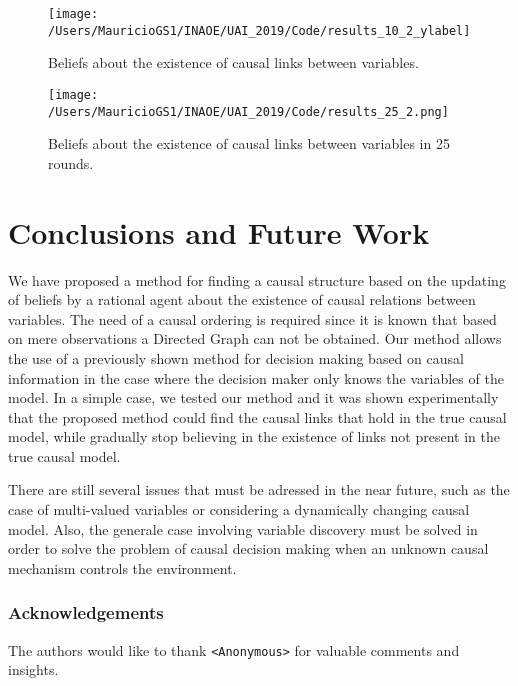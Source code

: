 \documentclass[letterpaper]{article}
\begin{document}
\begin{figure}[ht]
\vskip 0.2in
\begin{center}
\centerline{\texttt{[image: /Users/MauricioGS1/INAOE/UAI\_2019/Code/results\_10\_2\_ylabel]}}
\caption{Beliefs about the existence of causal links between variables.}
\label{10_rounds}
\end{center}
\vskip -0.2in
\end{figure}

\begin{figure}[ht]
\vskip 0.2in
\begin{center}
\centerline{\texttt{[image: /Users/MauricioGS1/INAOE/UAI\_2019/Code/results\_25\_2.png]}}
\caption{Beliefs about the existence of causal links between variables in 25 rounds.}
\label{25_rounds}
\end{center}
\vskip -0.2in
\end{figure}

\section{Conclusions and Future Work}
We have proposed a method for finding a causal structure based on the updating of beliefs by a rational agent about the existence of causal relations between variables. The need of a causal ordering is required since it is known that based on mere observations a Directed Graph can not be obtained. Our method allows the use of a previously shown method for decision making based on causal information in the case where the decision maker only knows the variables of the model. In a simple case, we tested our method and it was shown experimentally that the proposed method could find the causal links that hold in the true causal model, while gradually stop believing in the existence of links not present in the true causal model.

There are still several issues that must be adressed in the near future, such as the case of multi-valued variables or considering a dynamically changing causal model. Also, the generale case involving variable discovery must be solved in order to solve the problem of causal decision making when an unknown causal mechanism controls the environment. 

\newpage
\subsubsection*{Acknowledgements}
The authors would like to thank \texttt{<Anonymous>} for valuable comments and insights. 



\end{document}
